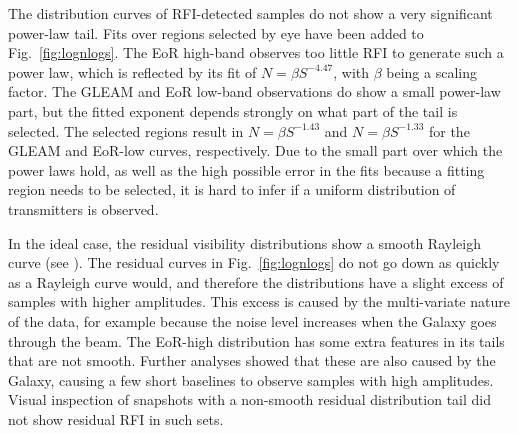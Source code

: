 \documentclass{pasa}
\begin{document}
The distribution curves of RFI-detected samples do not show a very significant power-law tail. Fits over regions selected by eye have been added to Fig.~\ref{fig:lognlogs}. The EoR high-band observes too little RFI to generate such a power law, which is reflected by its fit of $N=\beta S^{-4.47}$, with $\beta$ being a scaling factor. The GLEAM and EoR low-band observations do show a small power-law part, but the fitted exponent depends strongly on what part of the tail is selected. The selected regions result in $N=\beta S^{-1.43}$ and $N=\beta S^{-1.33}$ for the GLEAM and EoR-low curves, respectively. Due to the small part over which the power laws hold, as well as the high possible error in the fits because a fitting region needs to be selected, it is hard to infer if a uniform distribution of transmitters is observed.

In the ideal case, the residual visibility distributions show a smooth Rayleigh curve (see \citealt{offringa-rfi-distributions}). The residual curves in Fig.~\ref{fig:lognlogs} do not go down as quickly as a Rayleigh curve would, and therefore the distributions have a slight excess of samples with higher amplitudes. This excess is caused by the multi-variate nature of the data, for example because the noise level increases when the Galaxy goes through the beam. The EoR-high distribution has some extra features in its tails that are not smooth. Further analyses showed that these are also caused by the Galaxy, causing a few short baselines to observe samples with high amplitudes. Visual inspection of snapshots with a non-smooth residual distribution tail did not show residual RFI in such sets.
\end{document}

